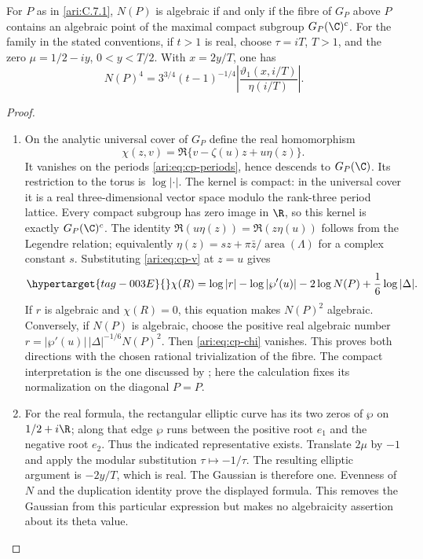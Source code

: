 \begin{proposition}\hypertarget{tag-001B}{}\label{ari:C.7.2}

For $P$ as in \cref{ari:C.7.1}, $N(P)$ is algebraic if and only
if the fibre of $G_P$ above $P$ contains an algebraic point of
the maximal compact subgroup $G_P(\C)^c$.
For the family in the stated conventions, if $t>1$ is real, choose
$\tau=iT$, $T>1$, and the zero $\mu=1/2-iy$, $0<y<T/2$.
With $x=2y/T$, one has
\[
 N(P)^4=3^{3/4}(t-1)^{-1/4}
       \left|\frac{\vartheta_1(x,i/T)}{\eta(i/T)}\right|.
\]
\end{proposition}


\begin{proof}
\begin{enumerate}[label=\arabic*.,leftmargin=*]
\item On the analytic universal cover of $G_P$ define the real
homomorphism
\[
 \chi(z,v)=\Re\{v-\zeta(u)z+u\eta(z)\}.
\]
It vanishes on the periods \eqref{ari:eq:cp-periods}, hence descends
to $G_P(\C)$. Its restriction to the torus is $\log|\cdot|$.
The kernel is compact: in the universal cover it is a real
three-dimensional vector space modulo the rank-three period
lattice. Every compact subgroup has zero image in $\R$, so
this kernel is exactly $G_P(\C)^c$.
The identity
$\Re(u\eta(z))=\Re(z\eta(u))$ follows from the Legendre relation;
equivalently $\eta(z)=sz+\pi\bar z/\operatorname{area}(\Lambda)$
for a complex constant $s$. Substituting
\eqref{ari:eq:cp-v} at $z=u$ gives
\begin{equation}\hypertarget{tag-003E}{}\label{ari:eq:cp-chi}
 \chi(R)=\log|r|-\log|\wp'(u)|
            -2\log N(P)+\frac16\log|\Delta|.
\end{equation}
If $r$ is algebraic and $\chi(R)=0$, this equation makes
$N(P)^2$ algebraic. Conversely, if $N(P)$ is algebraic,
choose the positive real algebraic number
$r=|\wp'(u)|\,|\Delta|^{-1/6}N(P)^2$.
Then \eqref{ari:eq:cp-chi} vanishes. This proves both directions
with the chosen rational trivialization of the fibre.
The compact interpretation is the one discussed by
\citet[slides 5--8]{bertrand2017}; here the calculation fixes
its normalization on the diagonal $P=P$.

\item For the real formula, the rectangular elliptic curve has its
two zeros of $\wp$ on $1/2+i\R$; along that edge $\wp$ runs
between the positive root $e_1$ and the negative root $e_2$.
Thus the indicated representative exists. Translate $2\mu$
by $-1$ and apply the modular substitution $\tau\mapsto-1/\tau$.
The resulting elliptic argument is $-2y/T$, which is real.
The Gaussian is therefore one. Evenness of $N$ and the
duplication identity prove the displayed formula. This removes
the Gaussian from this particular expression but makes no
algebraicity assertion about its theta value.
\end{enumerate}
\end{proof}